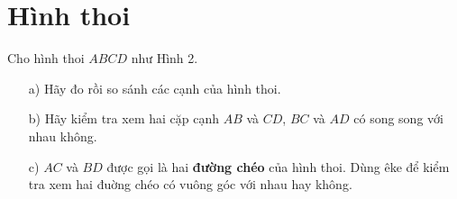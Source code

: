 \documentclass[12pt]{article}
\begin{document}
\section{Hình thoi}
\begin{paracol}{2}
Cho hình thoi \(ABCD\) như Hình 2.
\begin{itemize}
  \item[a)] Hãy đo rồi so sánh các cạnh của hình thoi.
  \item[b)] Hãy kiểm tra xem hai cặp cạnh \(AB\) và \(CD\), \(BC\) và \(AD\) có song song với nhau không.
  \item[c)] \(AC\) và \(BD\) được gọi là hai \textbf{đường chéo} của hình thoi. Dùng êke để kiểm tra xem hai đuờng chéo có vuông góc với nhau hay không.
\end{itemize}
\switchcolumn
\begin{center}
\end{center}
\end{paracol}
\end{document}
